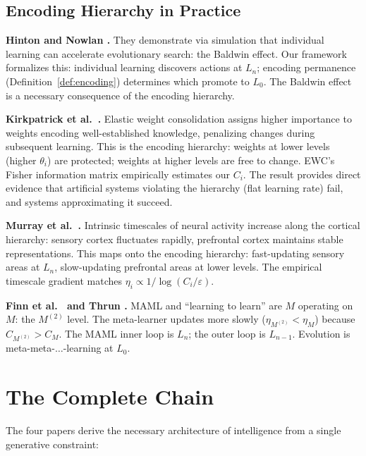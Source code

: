 \documentclass[11pt]{article}
\theoremstyle{definition}
\theoremstyle{remark}
\begin{document}
\subsection{Encoding Hierarchy in Practice}

\textbf{Hinton and Nowlan \cite{Hinton1987}.}
They demonstrate via simulation that individual learning can accelerate
evolutionary search: the Baldwin effect. Our framework formalizes this:
individual learning discovers actions at $L_n$; encoding permanence
(Definition~\ref{def:encoding}) determines which promote to $L_0$. The
Baldwin effect is a necessary consequence of the encoding hierarchy.

\textbf{Kirkpatrick et al.\ \cite{Kirkpatrick2017}.}
Elastic weight consolidation assigns higher importance to weights
encoding well-established knowledge, penalizing changes during
subsequent learning. This is the encoding hierarchy: weights at lower
levels (higher $\theta_i$) are protected; weights at higher levels are
free to change. EWC's Fisher information matrix empirically estimates
our $C_i$. The result provides direct evidence that artificial systems
violating the hierarchy (flat learning rate) fail, and systems
approximating it succeed.

\textbf{Murray et al.\ \cite{Murray2014}.}
Intrinsic timescales of neural activity increase along the cortical
hierarchy: sensory cortex fluctuates rapidly, prefrontal cortex
maintains stable representations. This maps onto the encoding
hierarchy: fast-updating sensory areas at $L_n$, slow-updating
prefrontal areas at lower levels. The empirical timescale gradient
matches $\eta_i \propto 1/\log(C_i / \varepsilon)$.

\textbf{Finn et al.\ \cite{FinnEtAl2017} and Thrun
\cite{Thrun1998}.}
MAML and ``learning to learn'' are $M$ operating on $M$: the
$M^{(2)}$ level. The meta-learner updates more slowly
($\eta_{M^{(2)}} < \eta_M$) because $C_{M^{(2)}} > C_M$. The MAML
inner loop is $L_n$; the outer loop is $L_{n-1}$. Evolution is
meta-meta-$\ldots$-learning at $L_0$.

\section{The Complete Chain}
\label{sec:chain}

The four papers derive the necessary architecture of intelligence from
a single generative constraint:
\end{document}
